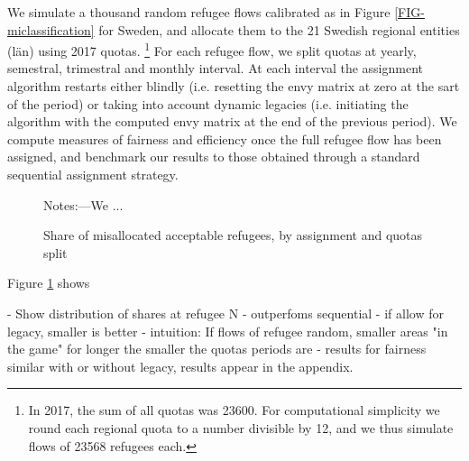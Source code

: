 \documentclass[11pt]{article}
\begin{document}
We simulate a thousand random refugee flows calibrated as in Figure \ref{FIG-miclassification} for Sweden, and allocate them to the 21 Swedish regional entities (l{\"a}n) using 2017 quotas. \footnote{In 2017, the sum of all quotas was 23600. For computational simplicity we round each regional quota to a number divisible by 12, and we thus simulate flows of 23568 refugees each.} For each refugee flow, we split quotas at yearly, semestral, trimestral and monthly interval. At each interval the assignment algorithm restarts either blindly (i.e. resetting the envy matrix at zero at the sart of the period) or taking into account dynamic legacies (i.e. initiating the algorithm with the computed envy matrix at the end of the previous period). We compute measures of fairness and efficiency once the full refugee flow has been assigned, and benchmark our results to those obtained through a standard sequential assignment strategy.

\begin{figure}
	\caption{Share of misallocated acceptable refugees, by assignment and quotas split \label{FIG-quotas}}
	\begin{center}
	\end{center}
	{\footnotesize {\sc Notes:}---We ...}
\end{figure}

Figure \ref{FIG-quotas} shows 

- Show distribution of shares at refugee N
- outperfoms sequential
- if allow for legacy, smaller is better
- intuition: If flows of refugee random, smaller areas "in the game" for longer the smaller the quotas periods are
- results for fairness similar with or without legacy, results appear in the appendix.



\end{document}
